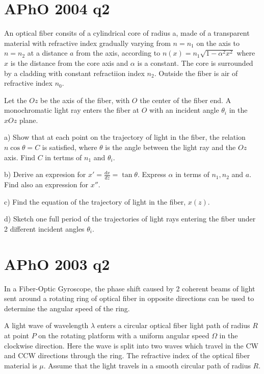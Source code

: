 \documentclass{article}
\title{}
\date{}
\newcommand{\<}{\langle}
\renewcommand{\>}{\rangle}
\begin{document}
\maketitle

\section{APhO 2004 q2}

An optical fiber consits of a cylindrical core of radius a, made of a transparent material with refractive index gradually varying from $n=n_1$ on the axis to $n = n_2$ at a distance $a$ from the axis, according to $n(x) = n_1\sqrt{1-\alpha^2x^2}$ where $x$ is the distance from the core axis and $\alpha$ is a constant. The core is surrounded by a cladding with constant refractiion index $n_2$. Outside the fiber is air of refractive index $n_0$.

Let the $Oz$ be the axis of the fiber, with $O$ the center of the fiber end. A monochromatic light ray enters the fiber at $O$ with an incident angle $\theta_i$ in the $xOz$ plane.

a) Show that at each point on the trajectory of light in the fiber, the relation $n\cos\theta = C$ is satisfied, where $\theta$ is the angle between the light ray and the $Oz$ axis. Find $C$ in tertms of $n_1$ and $\theta_i$.

b) Derive an expresion for $x' = \frac{dx}{dz} = \tan\theta$. Express $\alpha$ in terms of $n_1, n_2$ and $a$. Find also an expression for $x''$.

c) Find the equation of the trajectory of light in the fiber, $x(z)$.

d) Sketch one full period of the trajectories of light rays entering the fiber under 2 different incident angles $\theta_i$.

\section{APhO 2003 q2}

In a Fiber-Optic Gyroscope, the phase shift caused by 2 coherent beams of light sent around a rotating ring of optical fiber in opposite directions can be used to determine the angular speed of the ring.

A light wave of wavelength $\lambda$ enters a circular optical fiber light path of radius $R$ at point $P$ on the rotating platform with a uniform angular speed $\Omega$ in the clockwise direction. Here the wave is split into two waves which travel in the CW and CCW directions through the ring. The refractive index of the optical fiber material is $\mu$. Assume that the light travels in a smooth circular path of radius $R$.
\end{document}
